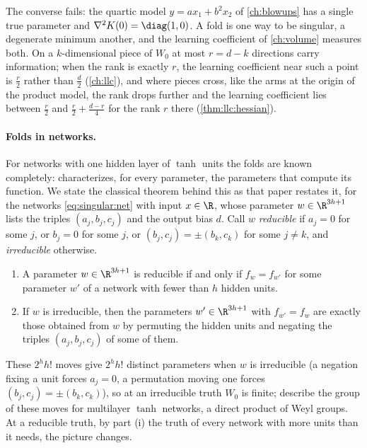 \begin{refsection}
The converse fails: the quartic model $y=ax_1+b^2x_2$ of \cref{ch:blowups} has a single true parameter and $\nabla^2K(0)=\diag(1,0)$. A fold is one way to be singular, a degenerate minimum another, and the learning coefficient of \cref{ch:volume} measures both. On a $k$-dimensional piece of $W_0$ at most $r=d-k$ directions carry information; when the rank is exactly $r$, the learning coefficient near such a point is $\frac r2$ rather than $\frac d2$ (\cref{ch:llc}), and where pieces cross, like the arms at the origin of the product model, the rank drops further and the learning coefficient lies between $\frac r2$ and $\frac r2+\frac{d-r}4$ for the rank $r$ there (\cref{thm:llc:hessian}).

\paragraph{Folds in networks.} For networks with one hidden layer of $\tanh$ units the folds are known completely: \textcite{FarrugiaRoberts2023a} characterizes, for every parameter, the parameters that compute its function. We state the classical theorem behind this as that paper restates it, for the networks \eqref{eq:singular:net} with input $x\in\R$, whose parameter $w\in\R^{3h+1}$ lists the triples $(a_j,b_j,c_j)$ and the output bias $d$. Call $w$ \emph{reducible} if $a_j=0$ for some $j$, or $b_j=0$ for some $j$, or $(b_j,c_j)=\pm(b_k,c_k)$ for some $j\ne k$, and \emph{irreducible} otherwise.

\begin{theorem}\label{thm:singular:sussmann}
\begin{enumerate}[label=(\roman*)]
\item A parameter $w\in\R^{3h+1}$ is reducible if and only if $f_w=f_{w'}$ for some parameter $w'$ of a network with fewer than $h$ hidden units.
\item If $w$ is irreducible, then the parameters $w'\in\R^{3h+1}$ with $f_{w'}=f_w$ are exactly those obtained from $w$ by permuting the hidden units and negating the triples $(a_j,b_j,c_j)$ of some of them.
\end{enumerate}
\end{theorem}

These $2^hh!$ moves give $2^hh!$ distinct parameters when $w$ is irreducible (a negation fixing a unit forces $a_j=0$, a permutation moving one forces $(b_j,c_j)=\pm(b_k,c_k)$), so at an irreducible truth $W_0$ is finite; \textcite{ChenEtAl1993} describe the group of these moves for multilayer $\tanh$ networks, a direct product of Weyl groups. At a reducible truth, by part (i) the truth of every network with more units than it needs, the picture changes.


\end{refsection}
